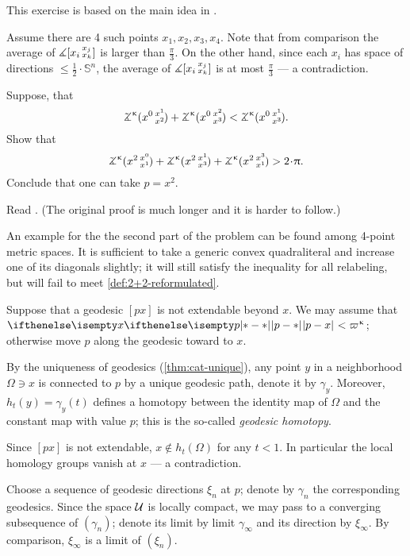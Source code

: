 This exercise is based on the main idea in \cite{hsiang-kleiner}.

\medskip

Assume there are 4 such points $x_1,x_2,x_3,x_4$.
Note that from comparison the average of $\measuredangle[x_i\,{}^{x_j}_{x_k}]$ is  larger than $\tfrac\pi3$.
On the other hand, since each $x_i$ has space of directions $\le\tfrac12\cdot\mathbb{S}^n$, the average of $\measuredangle[x_i\,{}^{x_j}_{x_k}]$ is at most $\tfrac\pi3$ --- a contradiction.


Suppose, that 
\[\angk\kappa {x^0}{x^1}{x^2}+\angk\kappa {x^0}{x^2}{x^3}<\angk\kappa {x^0}{x^1}{x^3}.\]
Show that
\[\angk\kappa {x^2}{x^0}{x^1}+\angk\kappa {x^2}{x^1}{x^3}+\angk\kappa {x^2}{x^3}{x^1}>2\cdot\pi.\]
Conclude that one can take $p=x^2$.



 Read \cite{sato}. (The original proof \cite{berg-nikolaev} is much longer and it is harder to follow.)

An example for the the second part of the problem can be found among 4-point metric spaces.
It is sufficient to take a generic convex quadraliteral and increase one of its diagonals slightly;
it will still satisfy the inequality for all relabeling, but will fail to meet \ref{def:2+2-reformulated}.

Suppose that a geodesic $[px]$ is not extendable beyond $x$.
We may assume that $\dist{p}{x}{}<\varpi\kappa$;
otherwise move $p$ along the geodesic toward to $x$.

By the uniqueness of geodesics (\ref{thm:cat-unique}), any point $y$ in a neighborhood $\Omega\ni x$ is connected to $p$ by a unique geodesic path, denote it by $\gamma_y$.
Moreover, $h_t(y)=\gamma_y(t)$ defines a homotopy between the identity map of $\Omega$ and the constant map with value $p$;
this is the  so-called \emph{geodesic homotopy}.

Since $[px]$ is not extendable, $x\notin h_t(\Omega)$ for any $t<1$.
In particular the local homology groups vanish at $x$ --- a contradiction.

 Choose a sequence of geodesic directions $\xi_n$ at $p$; denote by $\gamma_n$ the corresponding geodesics.
Since the space $\mathcal{U}$ is locally compact, we may pass to a converging subsequence of $(\gamma_n)$; denote its limit by limit $\gamma_\infty$ and its direction by $\xi_\infty$.
By comparison, $\xi_\infty$ is a limit of $(\xi_n)$.

